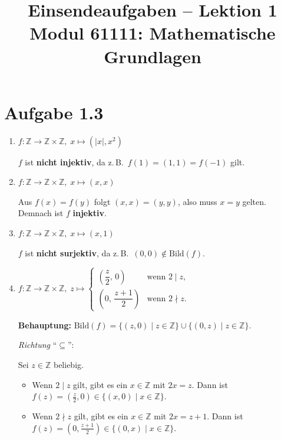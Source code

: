 \documentclass[a4paper,12pt]{article}
\title{Einsendeaufgaben -- Lektion 1\\[0.5em]
\large Modul 61111: Mathematische Grundlagen}
\author{}
\date{}
\begin{document}
\maketitle

\section*{Aufgabe 1.3}

\begin{enumerate}[label=\alph*)]

\item $f: \mathbb{Z} \to \mathbb{Z} \times \mathbb{Z},\; x \mapsto (|x|, x^2)$

$f$ ist \textbf{nicht injektiv}, da z.\,B.\ $f(1) = (1,1) = f(-1)$ gilt.

\item $f: \mathbb{Z} \to \mathbb{Z} \times \mathbb{Z},\; x \mapsto (x, x)$

Aus $f(x) = f(y)$ folgt $(x, x) = (y, y)$, also muss $x = y$ gelten.
Demnach ist $f$ \textbf{injektiv}.

\item $f: \mathbb{Z} \to \mathbb{Z} \times \mathbb{Z},\; x \mapsto (x, 1)$

$f$ ist \textbf{nicht surjektiv}, da z.\,B.\ $(0, 0) \notin \mathrm{Bild}(f)$.

\item $f: \mathbb{Z} \to \mathbb{Z} \times \mathbb{Z},\; z \mapsto
\begin{cases}
  \left(\dfrac{z}{2},\, 0\right) & \text{wenn } 2 \mid z, \\[6pt]
  \left(0,\, \dfrac{z+1}{2}\right) & \text{wenn } 2 \nmid z.
\end{cases}$

\medskip
\textbf{Behauptung:}
$\mathrm{Bild}(f) = \{(z, 0) \mid z \in \mathbb{Z}\} \cup \{(0, z) \mid z \in \mathbb{Z}\}$.

\medskip
\textit{Richtung} ``$\subseteq$'':

Sei $z \in \mathbb{Z}$ beliebig.
\begin{itemize}
  \item Wenn $2 \mid z$ gilt, gibt es ein $x \in \mathbb{Z}$ mit $2x = z$.
        Dann ist $f(z) = \left(\frac{z}{2}, 0\right) \in \{(x, 0) \mid x \in \mathbb{Z}\}$.
  \item Wenn $2 \nmid z$ gilt, gibt es ein $x \in \mathbb{Z}$ mit $2x = z + 1$.
        Dann ist $f(z) = \left(0, \frac{z+1}{2}\right) \in \{(0, x) \mid x \in \mathbb{Z}\}$.
\end{itemize}


\end{enumerate}
\end{document}

